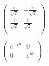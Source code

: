 \documentclass[11pt]{article}
\begin{document}
\begin{enumerate}
        \begin{doublespace}
            \noindent\(\left(
            \begin{array}{cc}
                \frac{i}{\sqrt{2}} & -\frac{i}{\sqrt{2}} \\
                \frac{1}{\sqrt{2}} & \frac{1}{\sqrt{2}}  \\
            \end{array}
            \right)\)
        \end{doublespace}

        \begin{doublespace}
            \noindent\(\left(
            \begin{array}{cc}
                e^{-i \theta } & 0             \\
                0              & e^{i \theta } \\
            \end{array}
            \right)\)
        \end{doublespace}
    \end{enumerate}
\end{document}
